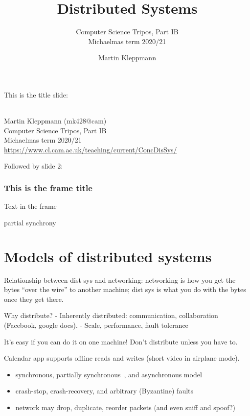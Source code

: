 
\title{Distributed Systems}
\subtitle{Computer Science Tripos, Part IB\\Michaelmas term 2020/21}
\author{Martin Kleppmann}
\date{}
\maketitle

This is the title slide:

\begin{frame}
    \label{s:title}
    \begin{center}
        \textbf{\huge{\color{darkblue}{Distributed Systems}}} \\[2em]
        Martin Kleppmann (mk428@cam) \\[2em]
        Computer Science Tripos, Part IB \\[0.5em]
        Michaelmas term 2020/21 \\[0.5em]
        \url{https://www.cl.cam.ac.uk/teaching/current/ConcDisSys/}
    \end{center}
\end{frame}

Followed by slide 2:

\begin{frame}
    \label{s:test}
    \frametitle{This is the frame title}
    Text in the frame

    partial synchrony~\cite{Dwork:1988dr}
\end{frame}

\section{Models of distributed systems}

Relationship between dist sys and networking: networking is how you get the bytes ``over the wire'' to another machine; dist sys is what you do with the bytes once they get there.

Why distribute?
- Inherently distributed: communication, collaboration (Facebook, google docs).
- Scale, performance, fault tolerance

It's easy if you can do it on one machine! Don't distribute unless you have to. 

Calendar app supports offline reads and writes (short video in airplane mode).

\begin{itemize}
\item synchronous, partially synchronous~\cite{Dwork:1988dr}, and asynchronous model
\item crash-stop, crash-recovery, and arbitrary (Byzantine) faults
\item network may drop, duplicate, reorder packets (and even sniff and spoof?)
\end{itemize}


